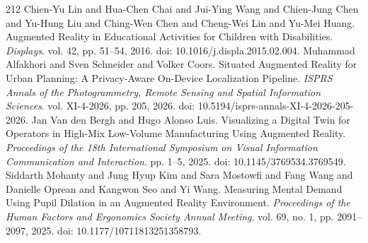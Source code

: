 \begin{thebibliography}{212}
 Chien-Yu Lin and Hua-Chen Chai and Jui-Ying Wang and Chien-Jung Chen and Yu-Hung Liu and Ching-Wen Chen and Cheng-Wei Lin and Yu-Mei Huang. Augmented Reality in Educational Activities for Children with Disabilities. \emph{Displays}. vol. 42, pp. 51--54, 2016. doi: 10.1016/j.displa.2015.02.004.
 Muhammad Alfakhori and Sven Schneider and Volker Coors. Situated Augmented Reality for Urban Planning: A Privacy-Aware On-Device Localization Pipeline. \emph{ISPRS Annals of the Photogrammetry, Remote Sensing and Spatial Information Sciences}. vol. XI-4-2026, pp. 205, 2026. doi: 10.5194/isprs-annals-XI-4-2026-205-2026.
 Jan Van den Bergh and Hugo Alonso Luis. Visualizing a Digital Twin for Operators in High-Mix Low-Volume Manufacturing Using Augmented Reality. \emph{Proceedings of the 18th International Symposium on Visual Information Communication and Interaction}. pp. 1--5, 2025. doi: 10.1145/3769534.3769549.
 Siddarth Mohanty and Jung Hyup Kim and Sara Mostowfi and Fang Wang and Danielle Oprean and Kangwon Seo and Yi Wang. Measuring Mental Demand Using Pupil Dilation in an Augmented Reality Environment. \emph{Proceedings of the Human Factors and Ergonomics Society Annual Meeting}. vol. 69, no. 1, pp. 2091--2097, 2025. doi: 10.1177/10711813251358793.
\end{thebibliography}
